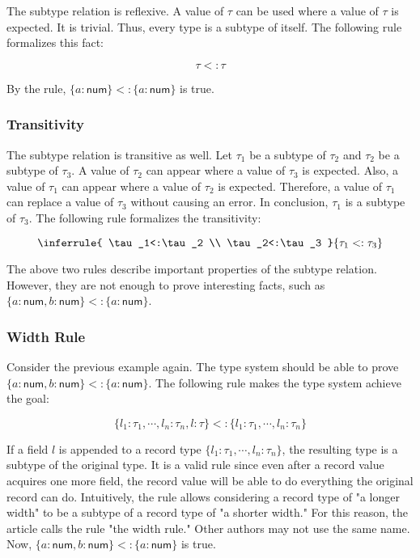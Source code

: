 The subtype relation is reflexive. A value of $\tau$ can be used where a value
of $\tau$ is expected. It is trivial. Thus, every type is a subtype of itself.
The following rule formalizes this fact:

\[\tau<:\tau\]

By the rule, $\{a:\textsf{num}\}<:\{a:\textsf{num}\}$ is true.

\subsubsection{Transitivity}

The subtype relation is transitive as well. Let $\tau_1$ be a subtype of
$\tau_2$ and $\tau_2$ be a subtype of $\tau_3$. A value of $\tau_2$ can
appear where a value of $\tau_3$ is expected. Also, a value of $\tau_1$ can
appear where a value of $\tau_2$ is expected. Therefore, a value of $\tau_1$
can replace a value of $\tau_3$ without causing an error. In conclusion,
$\tau_1$ is a subtype of $\tau_3$. The following rule formalizes the
transitivity:

\[
\inferrule
{ \tau_1<:\tau_2 \\ \tau_2<:\tau_3 }
{ \tau_1<:\tau_3 }
\]

The above two rules describe important properties of the subtype relation.
However, they are not enough to prove interesting facts, such as \(\{a:\textsf{
num},b:\textsf{num}\}<:\{a:\textsf{num}\}\).

\subsubsection{Width Rule}

Consider the previous example again. The type system should be able to prove
$\{a:\textsf{num},b:\textsf{num}\}<:\{a:\textsf{num}\}$. The following rule makes the
type system achieve the goal:

\[
\{l_1:\tau_1,\cdots,l_n:\tau_n,l:\tau\}<:\{l_1:\tau_1,\cdots,l_n:\tau_n\}
\]

If a field $l$ is appended to a record type
$\{l_1:\tau_1,\cdots,l_n:\tau_n\}$, the resulting type is a subtype of the
original type. It is a valid rule since even after a record value acquires one
more field, the record value will be able to do everything the original record
can do. Intuitively, the rule allows considering a record type of "a longer
width" to be a subtype of a record type of "a shorter width." For this reason,
the article calls the rule "the width rule." Other authors may not use the same
name. Now, $\{a:\textsf{num},b:\textsf{num}\}<:\{a:\textsf{num}\}$ is true.

